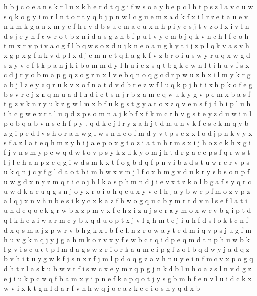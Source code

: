 \documentclass{article}
\begin{document}
h b j c o e a n s k r l u
x k h e r d
t q g i f w s o a y b e p c l h
t p s z l
a v c u w s q k o g y i m r l n t
o r t y q b j p n w l c g u e m z a d k f x i
l r z e
t a u e v n k m
k g a n x m y c f h r v d b
s u e
m a e u x n h p i y c s j t v z o l
x i v l n d s j e y h f c w r o t b z
n i d a s g z h b f p u l v y e m
b j q k v n e h l f c o
h t m x r y p i v a c g f l b q w s o z d u j k n e
o a u g h y t i j z p l q k v
a s y h x g p
x g f n k v d
p l x d j e m n c t q h a g k f v z b r o i u s w y
r u q x w g d s z y v c f t h p a n j k i b o m
m d y
l h u i c z s q t b g
k e w n l t i h u v f s x c d j r y o b m a p g q
z o g r n x l v e b q
n o q g c d r p w u z h x i l m y k
r g a b
j l z e y c q r u k v x o f n a t d
v d b r e z w f l u q k p j h t i
x h p k o f e g b s v r c j z n q m u a d
l h d i c t s n j r b z a m e q w u k y g v p o
m x b a s f t g z v k n r y u
k z g w l m x b f
u k g s t
g y a t o x z q v e n s f j d b i p l u h
i h c g w e x r t l u q d z p s o m n a j k b f
x f k m c r h v g s t e y z d u w i n l p o b q a
b v n s c h f p y t q d k e j l r
y z a h j t d m u n v k f c s
c k m q y b z g i p e d l v s h o r a n w
g l w s n h e o f m d y v t
p s c z x l
o d j p n k v y x s f a z
l a t e q h
m z y h i j a e p o x g t
o z i a t n h r m s
x i j h o z c
k h x g i f j v n s m y p c w q d
w t o v p s y k z d
k y o m j h t d r g a c e p s f
q r w s t l
j l e h a n p z c q g i w d s m k x t f o
g b d q
f p n v i b z d s t u w r
e r v p s u k q n j c y f g l d a o t b i m h w x
v m
j l f c x h m g v d u k r y e b s o n
p f u w g d x n y z m q t i c o j h l k a s
p h m n d j i e v x t z k o l b g a f s y q r c u w
d k a c u q g s n j o y x
r o
i o h q e u x y v c
l h j a y b w c p f m o z v
p z a l q j x n v h u b e s i k y c
x k a z f h w o g q u c b y m r t d v n l s e
f l a t i u h d e q o c k g r w b x z p m v
x f e h z i
z u j s e r a y m o x w c v b g i p t d q l k h
e z i w a r m c y b k q d u o p t x j v l g h
m t e j i u h f d s l
o k t c n f d x q s m a j z p w r v b h g
k x l b f c h n z r o w a y t e d m i q v p s j u g
f m h u v g k n q j y
j g a h m k o r v x y f e w b c t q i d p
e q m d t n p h u w b k l g v i s c
u c t p l m d a g s w z r i o
r k a u m c i p g f z o l b q d w y j
a d q z b v h i t u y g w k f j s n x
r f j m l p d o q g z a v h n u y
e i n f m c v x p o g q d h t r l a s k u b w
v t f i s w c x e y m r q p g j n k d b l u h o a z
s l n v d g z e j i u k p c w q f b a m x y
i p n e f k
a p q o t j y s g b m h f e n v l u i d c k x w
v i
x k t g n l d a r
f v n h w q j o c a z k e
e i o s h y q d x b
\end{document}
